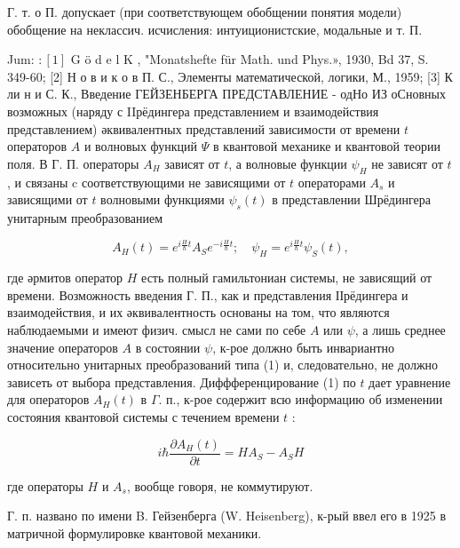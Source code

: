 \documentclass[10pt]{article}
\begin{document}
Г. т. о П. допускает (при соответствующем обобщении понятия модели) обобщение на неклассич. исчисления: интуиционистские, модальные и т. П.



Jum: $:[1]$ G ö d e l K , "Monatshefte für Math. und Phys.», 1930, Bd 37, S. 349-60; [2] Н о в и к о в П. С., Элементы математической, логики, М., 1959; [3] К ли н и С. К., Введение ГЕЙЗЕНБЕРГА ПРЕДСТАВЛЕНИЕ - одНо ИЗ оСновных возможных (наряду с IIрёдингера представлением и взаимодействия представлением) әквивалентных представлений зависимости от времени $t$ операторов $A$ и волновых функций $\Psi$ в квантовой механике и квантовой теории поля. В $Г$. П. операторы $A_{H}$ зависят от $t$, а волновые функции $\psi_{H}$ не зависят от $t$, и связаны c соответствующими не зависящими от $t$ операторами $A_{s}$ и зависящими от $t$ волновыми функциями $\psi_{s}(t)$ в представлении Шрёдингера унитарным преобразованием



\[

A_{H}(t)=e^{i \frac{H}{\hbar} t} A_{S} e^{-i \frac{H}{\hbar} t} ; \quad \psi_{H}=e^{i \frac{H}{\hbar} t} \psi_{S}(t),

\]



где әрмитов оператор $H$ есть полный гамильтониан системы, не зависящий от времени. Возможность введения Г. П., как и представления ІІрёдингера и взаимодействия, и их әквивалентность основаны на том, что являются наблюдаемыми и имеют физич. смысл не сами по себе $A$ или $\psi$, а лишь среднее значение операторов $A$ в состоянии $\psi$, к-рое должно быть инвариантно относительно унитарных преобразований типа (1) и, следовательно, не должно зависеть от выбора представления. Диффференцирование (1) по $t$ дает уравнение для операторов $A_{H}(t)$ в $\Gamma$. п., к-рое содержит всю информацию об изменении состояния квантовой системы с течением времени $t$ :



\[

i \hbar \frac{\partial A_{H}(t)}{\partial t}=H A_{S}-A_{S} H

\]



где операторы $H$ и $A_{s}$, вообще говоря, не коммутируют.



Г. п. названо по имени B. Гейзенберга (W. Heisenberg), к-рый ввел его в 1925 в матричной формулировке квантовой механики.
\end{document}
